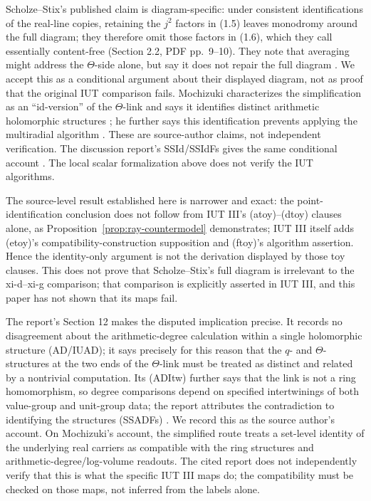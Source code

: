 \documentclass[11pt]{article}
\begin{document}
Scholze--Stix's published claim is diagram-specific: under consistent identifications of the real-line copies, retaining the $j^2$ factors in (1.5) leaves monodromy around the full diagram; they therefore omit those factors in (1.6), which they call essentially content-free (Section 2.2, PDF pp.~9--10). They note that averaging might address the $\Theta$-side alone, but say it does not repair the full diagram \cite[Section 2.2]{SS}. We accept this as a conditional argument about their displayed diagram, not as proof that the original IUT comparison fails. Mochizuki characterizes the simplification as an ``id-version'' of the $\Theta$-link and says it identifies distinct arithmetic holomorphic structures \cite[(C12), pp.~3--4]{MochizukiResponse}; he further says this identification prevents applying the multiradial algorithm \cite[(C13), p.~4]{MochizukiResponse}. These are source-author claims, not independent verification. The discussion report's SSId/SSIdFs gives the same conditional account \cite[Section 10, pp.~16--17]{MochizukiReport2018}. The local scalar formalization above does not verify the IUT algorithms.

The source-level result established here is narrower and exact: the point-identification conclusion does not follow from IUT III's (atoy)--(dtoy) clauses alone, as Proposition~\ref{prop:ray-countermodel} demonstrates; IUT III itself adds (etoy)'s compatibility-construction supposition and (ftoy)'s algorithm assertion. Hence the identity-only argument is not the derivation displayed by those toy clauses. This does not prove that Scholze--Stix's full diagram is irrelevant to the xi-d--xi-g comparison; that comparison is explicitly asserted in IUT III, and this paper has not shown that its maps fail.

The report's Section 12 makes the disputed implication precise. It records no disagreement about the arithmetic-degree calculation within a single holomorphic structure (AD/IUAD); it says precisely for this reason that the $q$- and $\Theta$-structures at the two ends of the $\Theta$-link must be treated as distinct and related by a nontrivial computation. Its (ADItw) further says that the link is not a ring homomorphism, so degree comparisons depend on specified intertwinings of both value-group and unit-group data; the report attributes the contradiction to identifying the structures (SSADFs) \cite[Section 12, pp.~23--24]{MochizukiReport2018}. We record this as the source author's account. On Mochizuki's account, the simplified route treats a set-level identity of the underlying real carriers as compatible with the ring structures and arithmetic-degree/log-volume readouts. The cited report does not independently verify that this is what the specific IUT III maps do; the compatibility must be checked on those maps, not inferred from the labels alone.
\end{document}
